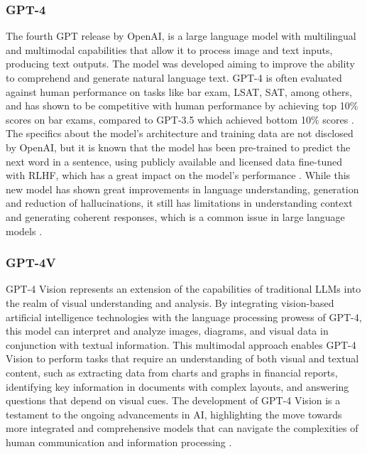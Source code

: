 \documentclass[english, 12pt, a4paper, elec, utf8, a-2b, online]{aaltothesis}
\begin{document}
\subsubsection{GPT-4}

The fourth \ac{GPT} release by OpenAI, is a large language model with multilingual and multimodal capabilities that allow it to process image and text inputs, producing text outputs.
The model was developed aiming to improve the ability to comprehend and generate natural language text.
\ac{GPT}-4 is often evaluated against human performance on tasks like bar exam, LSAT, SAT, among others, and has shown to be competitive with human performance by achieving top 10\% scores on bar exams, compared to \ac{GPT}-3.5 which achieved bottom 10\% scores \cite{OpenAI2023GPT4}.
The specifics about the model's architecture and training data are not disclosed by OpenAI, but it is known that the model has been pre-trained to predict the next word in a sentence, using publicly available and licensed data fine-tuned with \ac{RLHF}, which has a great impact on the model's performance \cite{OpenAI2023GPT4}.
While this new model has shown great improvements in language understanding, generation and reduction of hallucinations, it still has limitations in understanding context and generating coherent responses, which is a common issue in large language models \cite{OpenAI2023GPT4}.

\subsubsection{GPT-4V}

GPT-4 Vision represents an extension of the capabilities of traditional \ac{LLM}s into the realm of visual understanding and analysis.
By integrating vision-based artificial intelligence technologies with the language processing prowess of GPT-4, this model can interpret and analyze images, diagrams, and visual data in conjunction with textual information.
This multimodal approach enables GPT-4 Vision to perform tasks that require an understanding of both visual and textual content, such as extracting data from charts and graphs in financial reports, identifying key information in documents with complex layouts, and answering questions that depend on visual cues.
The development of GPT-4 Vision is a testament to the ongoing advancements in AI, highlighting the move towards more integrated and comprehensive models that can navigate the complexities of human communication and information processing \cite{2023GPT4VisionSC}.
\end{document}
